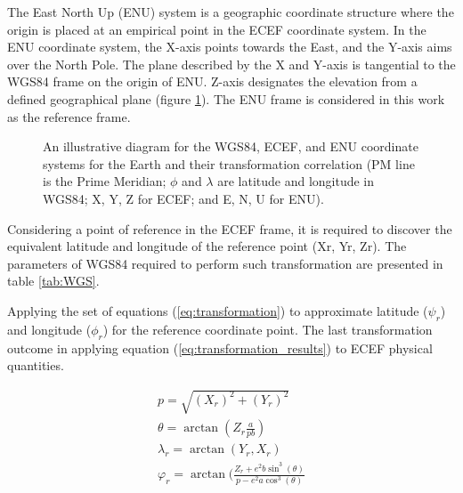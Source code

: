 The East North Up (ENU) system is a geographic coordinate structure where the origin is placed at an empirical point in the ECEF coordinate system.  In the ENU coordinate system, the X-axis points towards the East, and the Y-axis aims over the North Pole. The plane described by the X and Y-axis is tangential to the WGS84 frame on the origin of ENU. Z-axis designates the elevation from a defined geographical plane (figure \ref{fig:ECEF}). The ENU frame is considered in this work as the reference frame.

\begin{figure}[H]
    \centering
    \resizebox{0.70\linewidth}{!}{}
    \caption{An illustrative diagram for the WGS84, ECEF, and ENU coordinate systems for the Earth and their transformation correlation (PM line is the Prime Meridian; $\phi$ and $\lambda$ are latitude and longitude in WGS84; X, Y, Z for ECEF; and E, N, U for ENU).  }
    \label{fig:ECEF}
\end{figure}

Considering a point of reference in the ECEF frame, it is required to discover the equivalent latitude and longitude of the reference point (Xr, Yr, Zr). The parameters of WGS84 required to perform such transformation are presented in table \ref{tab:WGS}.

\begin{figure}[H]
    \centering
    
\end{figure}


Applying the set of equations (\ref{eq:transformation}) to approximate latitude ($\psi_r$) and longitude ($\phi_r$) for the reference coordinate point. The last transformation outcome in applying equation (\ref{eq:transformation_results}) to ECEF physical quantities.

\begin{equation}
    \begin{gathered}
        p = \sqrt{(X_r)^2 + (Y_r)^2} \\
        \theta = \arctan(Z_r\frac{a}{pb} ) \\
        \lambda_r = \arctan(Y_r,X_r) \\
        \varphi_r = \arctan(\frac{Z_r + e^2 b\sin^3(\theta)}{p - e^2 a \cos^3(\theta )}  \\
    \end{gathered}
    \label{eq:transformation}
\end{equation}

